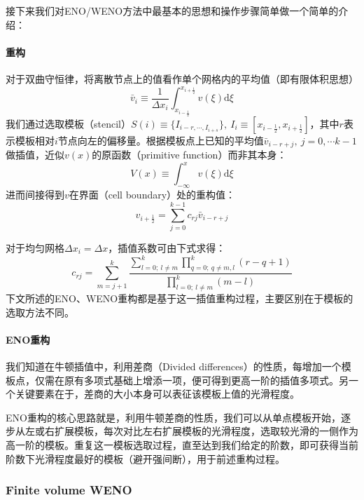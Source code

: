 \documentclass[11pt]{article}
\begin{document}
接下来我们对ENO/WENO方法中最基本的思想和操作步骤简单做一个简单的介绍：
\paragraph{重构} 对于双曲守恒律，将离散节点上的值看作单个网格内的平均值（即有限体积思想）
\begin{equation}
	\bar{v}_i\equiv\frac{1}{\Delta x_i}\int_{x_{i-\frac{1}{2}}}^{x_{i+\frac{1}{2}}}v(\xi)\mathrm{d}\xi
\end{equation}
我们通过选取模板（stencil）$S(i)\equiv\{I_{i-r,\cdots,I_{i+s}}\},\ I_i\equiv\left[x_{i-\frac{1}{2}},x_{i+\frac{1}{2}}\right]$，其中$r$表示模板相对$i$节点向左的偏移量。根据模板点上已知的平均值$\bar{v}_{i-r+j},\ j=0,\cdots k-1$做插值，近似$v(x)$的原函数（primitive function）而非其本身：
\begin{equation}
	V(x)\equiv\int_{-\infty}^x v(\xi)\mathrm{d}\xi
\end{equation}
进而间接得到$v$在界面（cell boundary）处的重构值：
\begin{equation}
	v_{i+\frac{1}{2}}=\sum_{j=0}^{k-1}c_{rj}\bar{v}_{i-r+j}
\end{equation}

对于均匀网格$\Delta x_i=\Delta x$，插值系数可由下式求得：
\begin{equation}
	c_{rj}=\sum_{m=j+1}^k\dfrac{\sum_{l=0;\ l\neq m}^k\prod_{q=0;\ q\neq m,l}^k\left(r-q+1\right)}{\prod_{l=0;\ l\neq m}^k\left(m-l\right)}
\end{equation}
下文所述的ENO、WENO重构都是基于这一插值重构过程，主要区别在于模板的选取方法不同。
\paragraph{ENO重构} 我们知道在牛顿插值中，利用差商（Divided differences）的性质，每增加一个模板点，仅需在原有多项式基础上增添一项，便可得到更高一阶的插值多项式\citep{sauer_numerical_2018}。另一个关键要素在于，差商的大小本身可以表征该模板上值的光滑程度\citep{cockburn_advanced_1998}。

ENO重构的核心思路就是，利用牛顿差商的性质，我们可以从单点模板开始，逐步从左或右扩展模板，每次对比左右扩展模板的光滑程度，选取较光滑的一侧作为高一阶的模板。重复这一模板选取过程，直至达到我们给定的阶数，即可获得当前阶数下光滑程度最好的模板（避开强间断），用于前述重构过程。


\subsubsection{Finite volume WENO}
\end{document}
